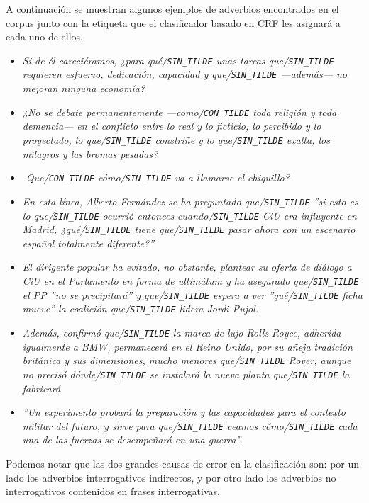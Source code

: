 \documentclass[runningheads,a4paper]{llncs}
\begin{document}
A continuación se muestran algunos ejemplos de adverbios encontrados en el corpus junto con la etiqueta que el clasificador basado en CRF les asignará a cada uno de ellos.
\begin{itemize}
\item{\emph{Si de él careciéramos, ¿para qu\'e/\texttt{\small SIN\_TILDE} unas tareas que/\texttt{\small SIN\_TILDE} requieren esfuerzo, dedicación, capacidad y que/\texttt{\small SIN\_TILDE} ---además--- no mejoran ninguna economía?}}

\item{\emph{¿No se debate permanentemente ---como/\texttt{\small CON\_TILDE} toda religión y toda de\-men\-cia--- en el conflicto entre lo real y lo ficticio, lo percibido y lo proyectado, lo que/\texttt{\small SIN\_TILDE} constriñe y lo que/\texttt{\small SIN\_TILDE} exalta, los milagros y las bromas pesadas?}}

\item{\emph{-Que/\texttt{\small CON\_TILDE} cómo/\texttt{\small SIN\_TILDE} va a llamarse el chiquillo?}}

\item{\emph{En esta línea, Alberto Fernández se ha preguntado que/\texttt{\small SIN\_TILDE} ''si esto es lo que/\texttt{\small SIN\_TILDE} ocurrió entonces cuando/\texttt{\small SIN\_TILDE} CiU era influyente en Madrid, ¿qu\'e/\texttt{\small SIN\_TILDE} tiene que/\texttt{\small SIN\_TILDE} pasar ahora con un escenario español totalmente diferente?''}}

\item{\emph{El dirigente popular ha evitado, no obstante, plantear su oferta de diálogo a CiU en el Parlamento en forma de ultimátum y ha asegurado que/\texttt{\small SIN\_TILDE} el PP ''no se precipitará'' y que/\texttt{\small SIN\_TILDE} espera a ver ''qué/\texttt{\small SIN\_TILDE} ficha mueve'' la coalición que/\texttt{\small SIN\_TILDE} lidera Jordi Pujol.}} 

\item{\emph{Además, confirmó que/\texttt{\small SIN\_TILDE} la marca de lujo Rolls Royce, adherida igualmente a BMW, permanecerá en el Reino Unido, por su añeja tradición británica y sus dimensiones, mucho menores que/\texttt{\small SIN\_TILDE} Rover, aunque no precisó d\'onde/\texttt{\small SIN\_TILDE} se instalará la nueva planta que/\texttt{\small SIN\_TILDE} la fabricará.}}

\item{\emph{''Un experimento probará la preparación y las capacidades para el contexto militar del futuro, y sirve para que/\texttt{\small SIN\_TILDE} veamos c\'omo/\texttt{\small SIN\_TILDE} cada una de las fuerzas se desempeñará en una guerra''. }}

\end{itemize}
Podemos notar que las dos grandes causas de error en la clasificación son: por un lado los adverbios interrogativos indirectos, y por otro lado los adverbios no interrogativos contenidos en frases interrogativas.
\end{document}
